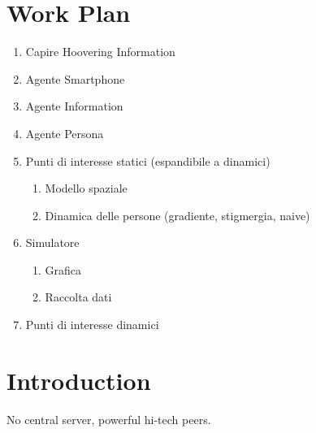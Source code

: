 \section{Work Plan}
	\begin{enumerate}
		\item Capire Hoovering Information
  	\item Agente Smartphone
  	\item Agente Information
  	\item Agente Persona
  	\item Punti di interesse statici (espandibile a dinamici)
			\begin{enumerate}
				\item Modello spaziale
				\item Dinamica delle persone (gradiente, stigmergia, naive)
			\end{enumerate}
  	\item Simulatore
			\begin{enumerate}
				\item Grafica
				\item Raccolta dati
			\end{enumerate}
  	\item Punti di interesse dinamici
	\end{enumerate}

\section{Introduction}
	No central server, powerful hi-tech peers.
